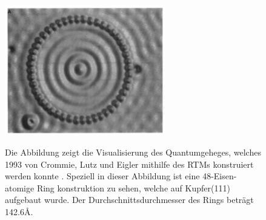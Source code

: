\begin{figure}
\centering
\caption{Die Abbildung zeigt die 
    Visualisierung des Quantumgeheges, welches 1993 von 
    Crommie, Lutz und Eigler mithilfe des RTMs 
    konstruiert werden konnte \cite{crommie1993imaging}. 
    Speziell in dieser Abbildung ist eine 48-Eisen-atomige 
Ring konstruktion zu sehen, welche auf Kupfer(111) aufgebaut wurde.
Der Durchschnittsdurchmesser des Rings beträgt 142.6\r{A}.}
\includegraphics[width=7cm]{pics/quantum_corral}
 \label{fig:quantum_corral}
\end{figure}

